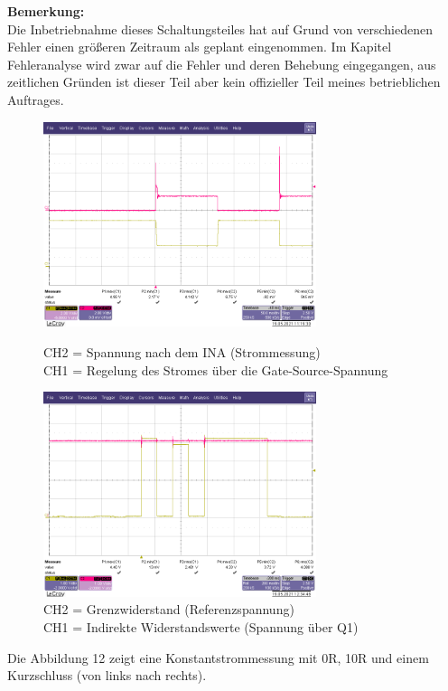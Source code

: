 \vspace{1,5cm}
\textbf{Bemerkung:}
\\
Die Inbetriebnahme dieses Schaltungsteiles hat auf Grund von verschiedenen Fehler einen größeren Zeitraum als geplant eingenommen. Im Kapitel Fehleranalyse wird zwar auf die Fehler und deren Behebung eingegangen, aus zeitlichen Gründen ist dieser Teil aber kein offizieller Teil meines betrieblichen Auftrages.


\begin{figure}[htb]
    \centering
    \begin{minipage}[t]{0.45\linewidth}
        \centering
        \includegraphics[width=8cm]{Bilder/INA-Spannung.png}
        \caption{CH2 = Spannung nach dem INA (Strommessung)\\
        			CH1 = Regelung des Stromes über die Gate-Source-Spannung}
    \end{minipage}%
    \hfill
    \begin{minipage}[t]{0.45\linewidth}
        \centering
        \includegraphics[width=8cm]{Bilder/Auswertung-Widerstand.png}
        \caption{CH2 = Grenzwiderstand (Referenzspannung)\\ 
        			CH1 = Indirekte Widerstandswerte (Spannung über Q1)}
    \end{minipage} 
\end{figure}

Die Abbildung 12 zeigt eine Konstantstrommessung mit 0R, 10R und einem Kurzschluss (von links nach rechts). 

